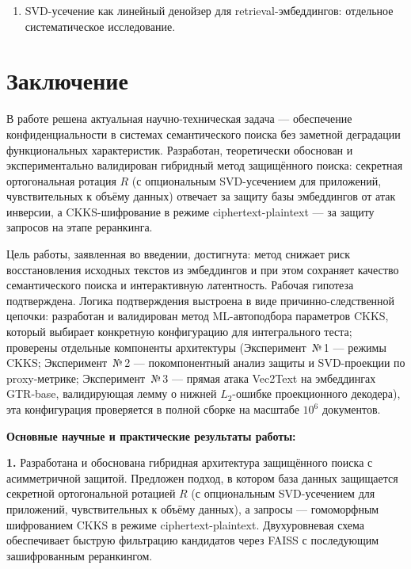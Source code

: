 \documentclass[a4paper, 12pt, oneside, openany]{article}
\begin{document}
\begin{enumerate}
\item SVD-усечение как линейный денойзер для retrieval-эмбеддингов: отдельное систематическое исследование.
\end{enumerate}


\section*{Заключение}

В работе решена актуальная научно-техническая задача — обеспечение конфиденциальности в системах семантического поиска без заметной деградации функциональных характеристик. Разработан, теоретически обоснован и экспериментально валидирован гибридный метод защищённого поиска: секретная ортогональная ротация $R$ (с опциональным SVD-усечением для приложений, чувствительных к объёму данных) отвечает за защиту базы эмбеддингов от атак инверсии, а CKKS-шифрование в режиме ciphertext-plaintext --- за защиту запросов на этапе реранкинга.

Цель работы, заявленная во введении, достигнута: метод снижает риск восстановления исходных текстов из эмбеддингов и при этом сохраняет качество семантического поиска и интерактивную латентность. Рабочая гипотеза подтверждена. Логика подтверждения выстроена в виде причинно-следственной цепочки: разработан и валидирован метод ML-автоподбора параметров CKKS, который выбирает конкретную конфигурацию для интегрального теста;  проверены отдельные компоненты архитектуры (Эксперимент~№\,1 --- режимы CKKS; Эксперимент~№\,2 --- покомпонентный анализ защиты и SVD-проекции по proxy-метрике; Эксперимент~№\,3 --- прямая атака Vec2Text на эмбеддингах GTR-base, валидирующая лемму о нижней $L_2$-ошибке проекционного декодера), эта конфигурация проверяется в полной сборке на масштабе $10^{6}$ документов.


\textbf{Основные научные и практические результаты работы:}

\textbf{1.} Разработана и обоснована гибридная архитектура защищённого поиска с асимметричной защитой. Предложен подход, в котором база данных защищается секретной ортогональной ротацией $R$ (с опциональным SVD-усечением для приложений, чувствительных к объёму данных), а запросы --- гомоморфным шифрованием CKKS в режиме ciphertext-plaintext. Двухуровневая схема обеспечивает быструю фильтрацию кандидатов через FAISS с последующим зашифрованным реранкингом.
\end{document}
